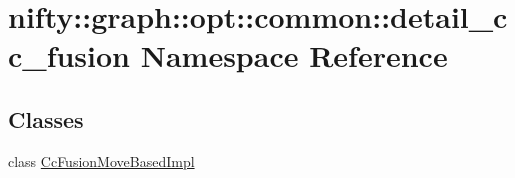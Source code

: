 \hypertarget{namespacenifty_1_1graph_1_1opt_1_1common_1_1detail__cc__fusion}{}\section{nifty\+:\+:graph\+:\+:opt\+:\+:common\+:\+:detail\+\_\+cc\+\_\+fusion Namespace Reference}
\label{namespacenifty_1_1graph_1_1opt_1_1common_1_1detail__cc__fusion}
\subsection*{Classes}
\begin{DoxyCompactItemize}
\item 
class \hyperlink{classnifty_1_1graph_1_1opt_1_1common_1_1detail__cc__fusion_1_1CcFusionMoveBasedImpl}{Cc\+Fusion\+Move\+Based\+Impl}
\end{DoxyCompactItemize}
